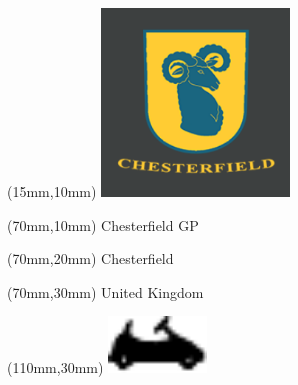 \null\newpage
\begin{textblock*}{50mm}(15mm,10mm)%
\includegraphics[width=50mm]{LG/2015-06-23_00001.png}
\end{textblock*}
\begin{textblock*}{130mm}(70mm,10mm)%
{\fontsize{20}{20}\selectfont Chesterfield GP}\\
\end{textblock*}
\begin{textblock*}{120mm}(70mm,20mm)%
{\fontsize{16}{16}\selectfont Chesterfield}\\
\end{textblock*}
\begin{textblock*}{120mm}(70mm,30mm)%
{\fontsize{12}{12}\selectfont United Kingdom}
\end{textblock*}
\begin{textblock*}{30mm}(110mm,30mm)%
\centering
\includegraphics[height=15mm]{icons/kart.pdf}
\end{textblock*}
